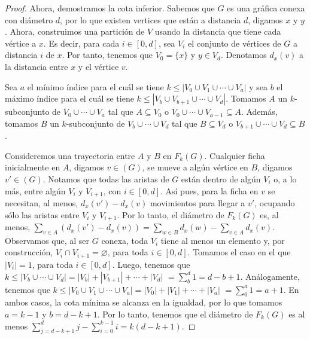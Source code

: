 \begin{proof}
    Ahora, demostramos la cota inferior. Sabemos que $G$ es una gr\'afica conexa
    con di\'ametro $d$, por lo que existen vertices que est\'an a distancia $d$,
    digamos $x$ y $y$. Ahora, construimos una partici\'on de $V$ usando la
    distancia que tiene cada v\'ertice a $x$. Es decir, para cada $i\in [0,d]$,
    sea $V_{i}$ el conjunto de v\'ertices de $G$ a distancia $i$ de $x$. Por
    tanto, tenemos que $V_{0}=\{x\}$ y $y\in V_{d}$. Denotamos $d_x(v)$ a la
    distancia entre $x$ y el v\'ertice $v$.

    Sea $a$ el m\'inimo \'indice para el cu\'al se tiene $k \leq |V_{0}\cup
    V_{1}\cup \cdots \cup V_{a}|$ y sea $b$ el m\'aximo \'indice para el cu\'al
    se tiene $k\leq |V_{b}\cup V_{b+1}\cup \cdots \cup V_{d}|$. Tomamos $A$ un
    $k$-subconjunto de $V_{0}\cup \cdots \cup V_{a}$  tal que $A\subseteq V_{0}$
    o $V_{0}\cup \cdots \cup V_{a-1}\subseteq A$. Adem\'as, tomamos $B$ un
    $k$-subconjunto de $V_{b}\cup \cdots \cup V_{d}$ tal que $B\subseteq V_{d}$
    o $V_{b+1}\cup \cdots \cup V_{d} \subseteq B$. 

    Consideremos una trayectoria entre $A$ y $B$ en $F_{k}(G)$. Cualquier ficha
    inicialmente en $A$, digamos $v \in (G)$, se mueve a alg\'un v\'ertice en
    $B$, digamos $v'\in (G)$. Notamos que todas las aristas de $G$ est\'an
    dentro de alg\'un $V_{i}$ o, a lo m\'as, entre alg\'un $V_{i}$ y $V_{i+1}$,
    con $i\in[0,d]$. As\'i pues, para la ficha en $v$ se necesitan, al menos,
    $d_x(v')-d_x(v)$ movimientos para llegar a $v'$, ocupando s\'olo las aristas
    entre $V_{i}$ y $V_{i+1}$. Por lo tanto, el di\'ametro de $F_{k}(G)$ es, al
    menos, $\sum_{v\in A}(d_x(v')-d_x(v))= \sum_{w\in B}d_x(w)-\sum_{v\in
    A}d_x(v)$. Observamos que, al ser $G$ conexa, toda $V_{i}$ tiene al menos un
    elemento y, por construcci\'on, $V_{i} \cap V_{i+1}=\varnothing$, para toda
    $i\in [0,d]$. Tomamos el caso en el que $|V_{i}|=1$, para toda $i\in [0,d]$.
    Luego, tenemos que $k\leq |V_{b}\cup\cdots\cup
    V_{d}|=|V_{b}|+|V_{b+1}|+\cdots +|V_d|$ $=\sum_{b}^{d}1 = d -b+1$.
    An\'alogamente, tenemos que $k\leq |V_{0}\cup V_{1}\cup \cdots \cup
    V_{a}|=|V_{0}|+|V_{1}|+\cdots + |V_{a}|$ $=\sum_{0}^{a} 1 = a+1$. En ambos
    casos, la cota m\'inima se alcanza en la igualdad, por lo que tomamos
    $a=k-1$ y $b=d-k+1$. Por lo tanto, tenemos que el di\'ametro de $F_{k}(G)$
    es al menos $\sum_{j=d -k+1}^{d}j - \sum_{i=0}^{k-1}i = k(d-k+1)$.
\end{proof}

